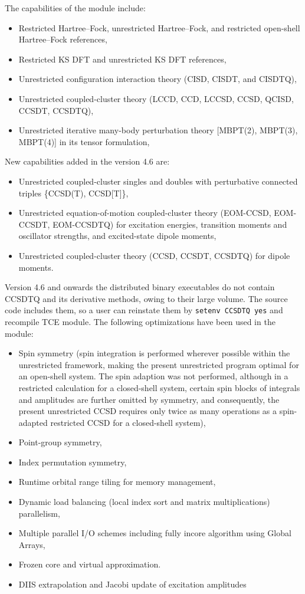 The capabilities of the module include:
\begin{itemize}
\item Restricted Hartree--Fock, unrestricted Hartree--Fock, and restricted open-shell
Hartree--Fock references,
\item Restricted KS DFT and unrestricted KS DFT references,
\item Unrestricted configuration interaction theory (CISD, CISDT, and CISDTQ),
\item Unrestricted coupled-cluster theory (LCCD, CCD, LCCSD, CCSD, QCISD, CCSDT, CCSDTQ),
\item Unrestricted iterative many-body perturbation theory [MBPT(2), MBPT(3), MBPT(4)] in its tensor formulation,
\end{itemize}
New capabilities added in the version 4.6 are:
\begin{itemize}
\item Unrestricted coupled-cluster singles and doubles with perturbative connected triples \{CCSD(T), CCSD[T]\},
\item Unrestricted equation-of-motion coupled-cluster theory (EOM-CCSD, EOM-CCSDT, EOM-CCSDTQ) for excitation energies, transition moments and oscillator strengths, and excited-state dipole moments,
\item Unrestricted coupled-cluster theory (CCSD, CCSDT, CCSDTQ) for dipole moments.
\end{itemize}
Version 4.6 and onwards the distributed binary executables do not contain CCSDTQ and its
derivative methods, owing to their large volume.  The source code includes them, so a user
can reinstate them by \verb+setenv CCSDTQ yes+ and recompile TCE module.
The following optimizations have been used in the module:
\begin{itemize}
\item Spin symmetry (spin integration is performed wherever possible within the
unrestricted framework, making the present unrestricted program 
optimal for an open-shell system.  The spin adaption was not performed, 
although in a restricted calculation for a closed-shell system, certain spin blocks of 
integrals and amplitudes are further omitted by symmetry, and
consequently, the present unrestricted CCSD requires only twice
as many operations as a spin-adapted restricted CCSD for a closed-shell system),
\item Point-group symmetry,
\item Index permutation symmetry,
\item Runtime orbital range tiling for memory management,
\item Dynamic load balancing (local index sort and matrix multiplications) parallelism,
\item Multiple parallel I/O schemes including fully incore algorithm using Global Arrays,
\item Frozen core and virtual approximation.
\item DIIS extrapolation and Jacobi update of excitation amplitudes
\end{itemize}

